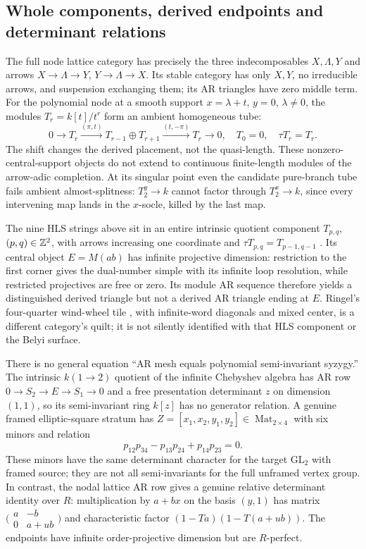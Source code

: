 \documentclass[11pt]{article}
\theoremstyle{definition}\newtheorem{definition}[theorem]{Definition}
\theoremstyle{remark}\newtheorem{remark}[theorem]{Remark}
\begin{document}
\subsection{Whole components, derived endpoints and determinant relations}
The full node lattice category has precisely the three indecomposables $X,\Lambda,Y$ and arrows $X\to\Lambda\to Y$, $Y\to\Lambda\to X$. Its stable category has only $X,Y$, no irreducible arrows, and suspension exchanging them; its AR triangles have zero middle term. For the polynomial node at a smooth support $x=\lambda+t$, $y=0$, $\lambda\ne0$, the modules $T_r=k[t]/t^r$ form an ambient homogeneous tube:
\[
 0\longrightarrow T_r\xrightarrow{(\pi,t)}T_{r-1}\oplus T_{r+1}
 \xrightarrow{(t,-\pi)}T_r\longrightarrow0,\quad T_0=0,\quad\tau T_r=T_r.
\]
The shift changes the derived placement, not the quasi-length. These nonzero-central-support objects do not extend to continuous finite-length modules of the arrow-adic completion. At its singular point even the candidate pure-branch tube fails ambient almost-splitness: $T_2^y\to k$ cannot factor through $T_2^x\to k$, since every intervening map lands in the $x$-socle, killed by the last map.

The nine HLS strings above sit in an entire intrinsic quotient component $T_{p,q}$, $(p,q)\in\mathbb Z^2$, with arrows increasing one coordinate and $\tau T_{p,q}=T_{p-1,q-1}$ \cite{HuangLinSu}. Its central object $E=M(ab)$ has infinite projective dimension: restriction to the first corner gives the dual-number simple with its infinite loop resolution, while restricted projectives are free or zero. Its module AR sequence therefore yields a distinguished derived triangle but not a derived AR triangle ending at $E$. Ringel's four-quarter wind-wheel tile \cite{Ringel}, with infinite-word diagonals and mixed center, is a different category's quilt; it is not silently identified with that HLS component or the Belyi surface.

There is no general equation ``AR mesh equals polynomial semi-invariant syzygy.'' The intrinsic $k(1\to2)$ quotient of the infinite Chebyshev algebra has AR row $0\to S_2\to E\to S_1\to0$ and a free presentation determinant $z$ on dimension $(1,1)$, so its semi-invariant ring $k[z]$ has no generator relation. A genuine framed elliptic-square stratum has $Z=[x_1,x_2,y_1,y_2]\in\operatorname{Mat}_{2\times4}$ with six minors and relation
\[
 p_{12}p_{34}-p_{13}p_{24}+p_{14}p_{23}=0.
\]
These minors have the same determinant character for the target $\mathrm{GL}_2$ with framed source; they are not all semi-invariants for the full unframed vertex group. In contrast, the nodal lattice AR row gives a genuine relative determinant identity over $R$: multiplication by $a+bx$ on the basis $(y,1)$ has matrix
$\bigl(\begin{smallmatrix}a&-b\\0&a+ub\end{smallmatrix}\bigr)$ and characteristic factor $(1-Ta)(1-T(a+ub))$. The endpoints have infinite order-projective dimension but are $R$-perfect.
\end{document}
